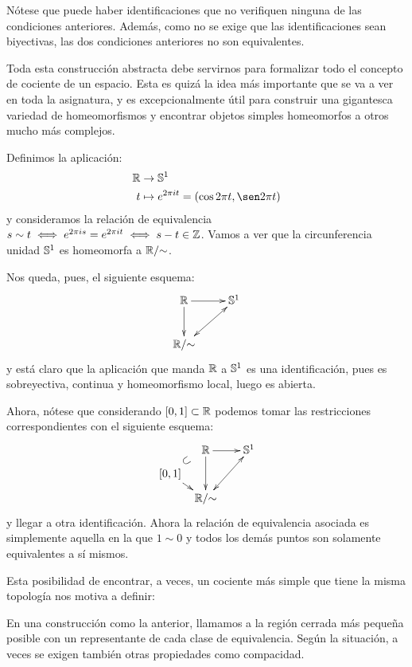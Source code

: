 Nótese que puede haber identificaciones que no verifiquen ninguna de las condiciones anteriores. Además, como no se exige que las identificaciones sean biyectivas, las dos condiciones anteriores no son equivalentes.

Toda esta construcción abstracta debe servirnos para formalizar todo el concepto de cociente de un espacio. Esta es quizá la idea más importante que se va a ver en toda la asignatura, y es excepcionalmente útil para construir una gigantesca variedad de homeomorfismos y encontrar objetos simples homeomorfos a otros mucho más complejos.

\begin{exa}
	Definimos la aplicación:
	\[\begin{split}
	\R&\to\esfera^1 \\
	t&\mapsto e^{2\pi it}=(\cos 2\pi t,\sen 2\pi t)
	\end{split}\]
	y consideramos la relación de equivalencia $s\sim t\iff e^{2\pi is}=e^{2\pi it}\iff s-t\in\mathbb{Z}$. Vamos a ver que la circunferencia unidad $\mathbb{S}^1$ es homeomorfa a $\mathbb{R}/\mathord{\sim}$.
	
	Nos queda, pues, el siguiente esquema:
	\[\xymatrix{
		\R \ar[r] \ar[d] &
		\esfera^1 \\
		\R/\mathord{\sim}  \ar@{<->}[ru]
	}\]
	y está claro que la aplicación que manda $\mathbb{R}$ a $\mathbb{S}^1$ es una identificación, pues es sobreyectiva, continua y homeomorfismo local, luego es abierta.
	
	Ahora, nótese que considerando $[0,1]\subset\mathbb{R}$ podemos tomar las restricciones correspondientes con el siguiente esquema:
	\[\xymatrix @C=0.5pc @R=0.5pc @L=-0.2pc {
		& \R \ar[rr] \ar[dd] & &
		\esfera^1 \\
		[0,1] \ar@{}[ur]^*[@]{\subset} \ar[dr] \\
		& \R/\mathord{\sim}  \ar@{<->}[rruu]
	}\]
	y llegar a otra identificación. Ahora la relación de equivalencia asociada es simplemente aquella en la que $1\sim 0$ y todos los demás puntos son solamente equivalentes a sí mismos.
\end{exa}

Esta posibilidad de encontrar, a veces, un cociente más simple que tiene la misma topología nos motiva a definir:

\begin{defi}
	En una construcción como la anterior, llamamos  a la región cerrada más pequeña posible con un representante de cada clase de equivalencia. Según la situación, a veces se exigen también otras propiedades como compacidad.
\end{defi}

